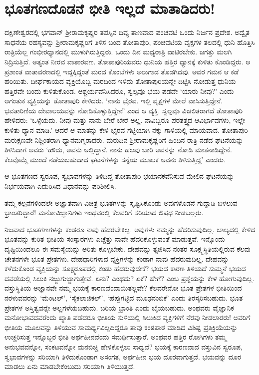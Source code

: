 \section*{ಭೂತಗಣದೊಡನೆ ಭೀತಿ ಇಲ್ಲದೆ ಮಾತಾಡಿದರು!}


ದಕ್ಷಿಣೇಶ್ವರದಲ್ಲಿ ಭಗವಾನ್ ಶ‍್ರೀರಾಮಕೃಷ್ಣರ ತಪಸ್ಸಿನ ದಿವ್ಯ ತಾಣವಾದ ಪಂಚವಟಿ ಒಂದು ನಿರ್ಜನ ಪ್ರದೇಶ. ಅದ್ವೈತ ಸಾಧನೆಯ ರಹಸ್ಯವನ್ನು ಶ‍್ರೀರಾಮಕೃಷ್ಣರಿಗೆ ತಿಳಿಸ ಬಂದ ತೋತಾಪುರಿ, ಪಂಚವಟಿಯ ವೃಕ್ಷಗಳ ತಲದಲ್ಲಿ ಧುನಿ ಹೊತ್ತಿಸಿ ರಾತ್ರಿಯೆಲ್ಲ ಗಂಭೀರಧ್ಯಾನದಲ್ಲಿ ಮುಳುಗಿರುತ್ತಿದ್ದರು. ಒಂದು ದಿನ ಮಧ್ಯರಾತ್ರಿ ದಾಟಿರಬೇಕು. ಜಗತ್ತು ಮಲಗಿ ನಿದ್ರಿಸುತ್ತಿದೆ. ಅತ್ಯಂತ ನೀರವ ವಾತಾರವಣ. ತೋತಾಪುರಿಯವರು ಧುನಿಯ ಹತ್ತಿರ ಧ್ಯಾನಕ್ಕೆ ಕುಳಿತು ಕೊಂಡಿದ್ದರು. ಆ ಪ್ರಶಾಂತ ವಾತಾವರಣದಲ್ಲಿ ಇದ್ದಕ್ಕಿದ್ದಂತೆ ಮರದ ಕೊಂಬೆಗಳು ಅಲುಗಾಡ ತೊಡಗಿದವು. ಅವರ ಗಮನ ಆ ಕಡೆ ಹರಿಯಿತು. ದೀರ್ಘಕಾಯದ ವ್ಯಕ್ತಿಯೊಬ್ಬ ಮರದಿಂದ ಇಳಿದು ತೋತಾಪುರಿಯನ್ನೇ ದಿಟ್ಟಿಸಿ ನೋಡುತ್ತ ಧುನಿಯ ಹತ್ತಿರವೇ ಬಂದು ಕುಳಿತುಕೊಂಡ. ಆಶ್ಚರ್ಯವೆನಿಸಿದರೂ, ಸ್ವಲ್ಪವೂ ಭಯ ಪಡದೇ ‘ಯಾರು ನೀವು?’ ಎಂದು ಆಗಂತುಕ ವ್ಯಕ್ತಿಯನ್ನು ತೋತಾಪುರಿ ಕೇಳಿದರು. ‘ನಾನು ಭೈರವ. ಇಲ್ಲಿ ವೃಕ್ಷಗಳ ಮೇಲೆ ವಾಸಿಸುತ್ತಿದ್ದೇನೆ. ಭವತಾರಿಣಿಯ ದೇವಾಲಯವನ್ನು ನೋಡಿಕೊಳ್ಳುತ್ತಿದ್ದೇನೆ’ ಎಂದ ಆ ವ್ಯಕ್ತಿ. ಸ್ವಲ್ಪವೂ ವಿಚಲಿತರಾಗದೆ ತೋತಾಪುರಿ ಹೇಳಿದರು: ‘ಒಳ್ಳೆಯದು. ನೀವು ಮತ್ತು ನಾನು ಬೇರೆ ಬೇರೆ ಅಲ್ಲ. ನಾವಿಬ್ಬರೂ ಪರತತ್ತ್ವದ ಆವಿರ್ಭಾವಗಳು, ಇಲ್ಲೇ ಕುಳಿತು ಧ್ಯಾನ ಮಾಡಿ.’ ಆದರೆ ಆ ಮಾತನ್ನು ಕೇಳಿ ಭೈರವ ಗಟ್ಟಿಯಾಗಿ ನಕ್ಕು ಗಾಳಿಯಲ್ಲಿ ಮಾಯವಾದ. ತೋತಾಪುರಿ ಮರುಕ್ಷಣವೇ ನಿಶ್ಚಿಂತರಾಗಿ ಧ್ಯಾನಮಗ್ನರಾದರು. ಮರುದಿನ ಶ‍್ರೀರಾಮಕೃಷ್ಣರಿಗೆ ಹಿಂದಿನ ರಾತ್ರಿ ನಡೆದ ಘಟನೆಯನ್ನು ತಿಳಿಸಿದಾಗ ಅವರು ‘ಹೌದು, ಅವನು ಅಲ್ಲಿದ್ದಾನೆ. ನಾನು ಹಲವು ಬಾರಿ ಅವನನ್ನು ನೋಡಿ ಮಾತನಾಡಿದ್ದೇನೆ. ಕೆಲವೊಮ್ಮೆ ಮುಂದೆ ನಡೆಯಬಹುದಾದ ಘಟನೆಗಳನ್ನು ಸನ್ನೆಯ ಮೂಲಕ ಅವನು ತಿಳಿಸುತ್ತಿದ್ದ’ ಎಂದರು.

ಆ ಭೂತಗಣದ ಸ್ವರೂಪ, ಸ್ವಭಾವಗಳನ್ನು ತಿಳಿದಿದ್ದ ತೋತಾಪುರಿ ಭಯಾನಕವೆನಿಸುವ ಮೇಲಿನ ಘಟನೆಯನ್ನು ನಿರ್ಭಯವಾಗಿ ಎದುರಿಸಿದ ವಿಧಾನವನ್ನು ಪರಿಶೀಲಿಸಿ.

ತಮ್ಮ ಕಲ್ಪನೆಗಳಿಂದಲೇ ಅಜ್ಞಾತವಾಗಿ ವಿಚಿತ್ರ ಭೂತಗಳನ್ನು ಸೃಷ್ಟಿಸಿಕೊಂಡು ಅವುಗಳೊಡನೆ ಗುದ್ದಾಡಿ ಬಳಲುವ ಭ್ರಾಂತರಿದ್ದಾರೆ! ಮನೋವಿಜ್ಞಾನಿಗಳು ಇಂಥವರಲ್ಲಿ ಕೆಲವರಿಗೆ ಸರಿಯಾದ ಔಷಧ ನೀಡಬಲ್ಲರು.

ನಿಜವಾದ ಭೂತಗಣಗಳನ್ನು ಕಂಡರೂ ನಾವು ಹೆದರಬೇಕಿಲ್ಲ. ಅವುಗಳು ನಮ್ಮನ್ನು ಹೆದರಿಸುವುದಿಲ್ಲ. ಬಾಲ್ಯದಲ್ಲಿ ಕೇಳಿದ ಭೂತವನ್ನು ಕುರಿತ ಭೀತಿಯ ಸಂಸ್ಕಾರಗಳು ಎಚ್ಚೆತ್ತು ನಾವೇ ಹೆದರಿಕೊಳ್ಳುವಂತೆ ಮಾಡುತ್ತವೆ. ಇನ್ನೊಂದು ದೃಷ್ಟಿಯಿಂದಲೂ ಈ ಸಮಸ್ಯೆಯನ್ನು ಅರಿತು ಕೊಳ್ಳಬೇಕು. ದೇಹವನ್ನು ತ್ಯಜಿಸಿದ ನಂತರ ಸೂಕ್ಷ್ಮಸ್ಥಿತಿಯಲ್ಲಿರುವ ಕೆಲವು ಚೇತನಗಳೇ ಭೂತ ಪ್ರೇತಗಳು. ದೇಹಧಾರಿಗಳಾದ ವ್ಯಕ್ತಿಗಳನ್ನು ಕಂಡಾಗ ನಾವು ಹೆದರುವುದಿಲ್ಲ. ದೇಹವನ್ನು ಕಳೆದುಕೊಂಡ ವ್ಯಕ್ತಿಯನ್ನು ಸೂಕ್ಷ್ಮರೂಪದಲ್ಲಿ ಕಂಡು ಹೆದರುವುದೇಕೆ? ಭಯದ ಕಾರಣ ತಿಳಿಯದೆ ಸುಮ್ಮನೆ ಭಯದ ದವಡೆಯಲ್ಲಿ ಸಿಲುಕಿ ನಜ್ಜುಗುಜ್ಜಾಗುತ್ತೇವೆ. ಏನು? ಎಂಥದು? ಏಕೆ? ಹೇಗೆ? ಎಂಬ ಪ್ರಶ್ನೆಯನ್ನು ಕೇಳ ಹೋಗುವುದಿಲ್ಲ. ವಸ್ತುಸ್ಥಿತಿಯ ಅಜ್ಞಾನವೇ ನಮ್ಮ ಭಯಕ್ಕೆ ಕಾರಣವೆಂದಾಯಿತಲ್ಲವೇ? ಕೆಲವರೇನೋ ಭೂತ ಪ್ರೇತಗಳ ಭೀತಿಯಿಂದ ನರಳುವವರನ್ನು ‘ಮೆಂಟಲ್​’, ‘ಸೈಕಲಾಜಿಕಲ್​’, ‘ಹೆಪ್ಪುಗಟ್ಟಿದ ಮೂಢನಂಬಿಕೆ’ ಎಂದು ತಿರಸ್ಕರಿಸಬಹುದು. ಭೂತ ಪ್ರೇತಗಳ ಅಸ್ತಿತ್ವವನ್ನೇ ಅಲ್ಲಗಳೆಯಬಹುದು. ಬರಿಯ ಭ್ರಾಂತಿ ಎಂದು ಬೈಯಬಹುದು. ಅಂಥವರು ವೈಜ್ಞಾನಿಕ ಮನೋಭಾವದವರೆಂದು ಖ್ಯಾತಿ ಪಡೆದರೂ ಭೀತಿಯ ಸುಳಿಯಲ್ಲಿ ಸಿಲುಕಿದ ವ್ಯಕ್ತಿಗಳಿಗೆ ನೆರವು ನೀಡಲಾರರು! ಅವರಿಗೆ ಭೀತಿಯ ಮೂಲವನ್ನು ತಿಳಿಯುವ ಸಾಮರ್ಥ್ಯವಿಲ್ಲದಿದ್ದರೂ ತಾವು ಕಂಠಪಾಠ ಮಾಡಿದ ವಿಶಿಷ್ಟ ಪ್ರತಿಕ್ರಿಯೆಯನ್ನು ಉಚ್ಚರಿಸುತ್ತ ಇನ್ನೊಬ್ಬರ ಭೀತಿ ಅರ್ಥಹೀನವೆಂದು ಸಮರ್ಥಿಸುತ್ತಾರೆ. ಅಂಥವರ ಹತ್ತಿರ ರೋಗಿಗಳು ತಮ್ಮ ಅನುಭವವನ್ನೋ, ಸಂಕಟವನ್ನೋ ಮನಬಿಚ್ಚಿ ಹೇಳಿಕೊಳ್ಳಲು ಸಾಧ್ಯವೆ? ಭಯಕ್ಕೆ ಕಾರಣವಾದ ವಸ್ತುವಿನ ಸ್ವರೂಪ, ಸ್ವಭಾವಗಳನ್ನು ಸರಿಯಾಗಿ ತಿಳಿದುಕೊಂಡಾಗ ಅಸಂಗತ, ಅರ್ಥಹೀನ ಭಯ ದೂರವಾಗುತ್ತದೆ. ಭಯವನ್ನು ದೂರ ಮಾಡಲು ಏನು ಮಾಡಬೇಕೆಂಬುದು ಸರಿಯಾಗಿ ತಿಳಿಯುತ್ತದೆ.


